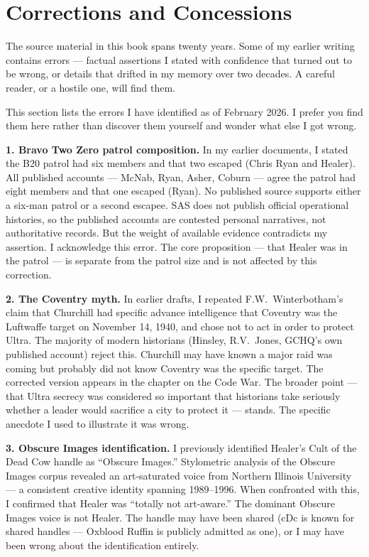 
\chapter*{Corrections and Concessions}

The source material in this book spans twenty years. Some of my earlier writing contains errors --- factual assertions I stated with confidence that turned out to be wrong, or details that drifted in my memory over two decades. A careful reader, or a hostile one, will find them.

This section lists the errors I have identified as of February 2026. I prefer you find them here rather than discover them yourself and wonder what else I got wrong.

\textbf{1. Bravo Two Zero patrol composition.} In my earlier documents, I stated the B20 patrol had six members and that two escaped (Chris Ryan and Healer). All published accounts --- McNab, Ryan, Asher, Coburn --- agree the patrol had eight members and that one escaped (Ryan). No published source supports either a six-man patrol or a second escapee. SAS does not publish official operational histories, so the published accounts are contested personal narratives, not authoritative records. But the weight of available evidence contradicts my assertion. I acknowledge this error. The core proposition --- that Healer was in the patrol --- is separate from the patrol size and is not affected by this correction.

\textbf{2. The Coventry myth.} In earlier drafts, I repeated F.W.\ Winterbotham's claim that Churchill had specific advance intelligence that Coventry was the Luftwaffe target on November 14, 1940, and chose not to act in order to protect Ultra. The majority of modern historians (Hinsley, R.V.\ Jones, GCHQ's own published account) reject this. Churchill may have known a major raid was coming but probably did not know Coventry was the specific target. The corrected version appears in the chapter on the Code War. The broader point --- that Ultra secrecy was considered so important that historians take seriously whether a leader would sacrifice a city to protect it --- stands. The specific anecdote I used to illustrate it was wrong.

\textbf{3. Obscure Images identification.} I previously identified Healer's Cult of the Dead Cow handle as ``Obscure Images.'' Stylometric analysis of the Obscure Images corpus revealed an art-saturated voice from Northern Illinois University --- a consistent creative identity spanning 1989--1996. When confronted with this, I confirmed that Healer was ``totally not art-aware.'' The dominant Obscure Images voice is not Healer. The handle may have been shared (cDc is known for shared handles --- Oxblood Ruffin is publicly admitted as one), or I may have been wrong about the identification entirely.

